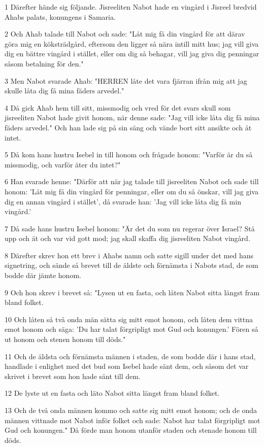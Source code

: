 \par 1 Därefter hände sig följande. Jisreeliten Nabot hade en vingård i Jisreel bredvid Ahabs palats, konungens i Samaria.
\par 2 Och Ahab talade till Nabot och sade: "Låt mig få din vingård för att därav göra mig en köksträdgård, eftersom den ligger så nära intill mitt hus; jag vill giva dig en bättre vingård i stället, eller om dig så behagar, vill jag giva dig penningar såsom betalning för den."
\par 3 Men Nabot svarade Ahab: "HERREN låte det vara fjärran ifrån mig att jag skulle låta dig få mina fäders arvedel."
\par 4 Då gick Ahab hem till sitt, missmodig och vred för det svars skull som jisreeliten Nabot hade givit honom, när denne sade: "Jag vill icke låta dig få mina fäders arvedel." Och han lade sig på sin säng och vände bort sitt ansikte och åt intet.
\par 5 Då kom hans hustru Isebel in till honom och frågade honom: "Varför är du så missmodig, och varför äter du intet?"
\par 6 Han svarade henne: "Därför att när jag talade till jisreeliten Nabot och sade till honom: 'Låt mig få din vingård för penningar, eller om du så önskar, vill jag giva dig en annan vingård i stället', då svarade han: 'Jag vill icke låta dig få min vingård.'
\par 7 Då sade hans hustru Isebel honom: "Är det du som nu regerar över Israel? Stå upp och ät och var vid gott mod; jag skall skaffa dig jisreeliten Nabot vingård.
\par 8 Därefter skrev hon ett brev i Ahabs namn och satte sigill under det med hans signetring, och sände så brevet till de äldste och förnämsta i Nabots stad, de som bodde där jämte honom.
\par 9 Och hon skrev i brevet så: "Lysen ut en fasta, och låten Nabot sitta längst fram bland folket.
\par 10 Och låten så två onda män sätta sig mitt emot honom, och låten dem vittna emot honom och säga: 'Du har talat förgripligt mot Gud och konungen.' Fören så ut honom och stenen honom till döds."
\par 11 Och de äldsta och förnämsta männen i staden, de som bodde där i hans stad, handlade i enlighet med det bud som Isebel hade sänt dem, och såsom det var skrivet i brevet som hon hade sänt till dem.
\par 12 De lyste ut en fasta och läto Nabot sitta längst fram bland folket.
\par 13 Och de två onda männen kommo och satte sig mitt emot honom; och de onda männen vittnade mot Nabot inför folket och sade: Nabot har talat förgripligt mot Gud och konungen." Då förde man honom utanför staden och stenade honom till döds.
